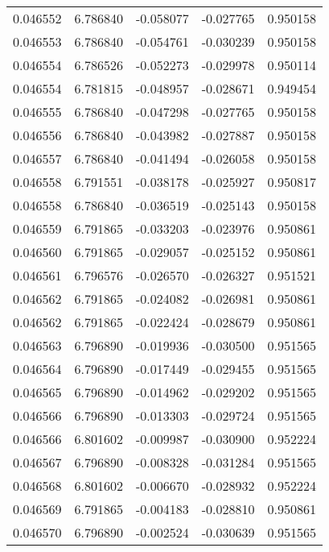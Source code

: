 \begin{tabular}{lrrrr}
0.046552    &  6.786840 & -0.058077 & -0.027765 &             0.950158 \\
0.046553    &  6.786840 & -0.054761 & -0.030239 &             0.950158 \\
0.046554    &  6.786526 & -0.052273 & -0.029978 &             0.950114 \\
0.046554    &  6.781815 & -0.048957 & -0.028671 &             0.949454 \\
0.046555    &  6.786840 & -0.047298 & -0.027765 &             0.950158 \\
0.046556    &  6.786840 & -0.043982 & -0.027887 &             0.950158 \\
0.046557    &  6.786840 & -0.041494 & -0.026058 &             0.950158 \\
0.046558    &  6.791551 & -0.038178 & -0.025927 &             0.950817 \\
0.046558    &  6.786840 & -0.036519 & -0.025143 &             0.950158 \\
0.046559    &  6.791865 & -0.033203 & -0.023976 &             0.950861 \\
0.046560    &  6.791865 & -0.029057 & -0.025152 &             0.950861 \\
0.046561    &  6.796576 & -0.026570 & -0.026327 &             0.951521 \\
0.046562    &  6.791865 & -0.024082 & -0.026981 &             0.950861 \\
0.046562    &  6.791865 & -0.022424 & -0.028679 &             0.950861 \\
0.046563    &  6.796890 & -0.019936 & -0.030500 &             0.951565 \\
0.046564    &  6.796890 & -0.017449 & -0.029455 &             0.951565 \\
0.046565    &  6.796890 & -0.014962 & -0.029202 &             0.951565 \\
0.046566    &  6.796890 & -0.013303 & -0.029724 &             0.951565 \\
0.046566    &  6.801602 & -0.009987 & -0.030900 &             0.952224 \\
0.046567    &  6.796890 & -0.008328 & -0.031284 &             0.951565 \\
0.046568    &  6.801602 & -0.006670 & -0.028932 &             0.952224 \\
0.046569    &  6.791865 & -0.004183 & -0.028810 &             0.950861 \\
0.046570    &  6.796890 & -0.002524 & -0.030639 &             0.951565 \\

\end{tabular}

